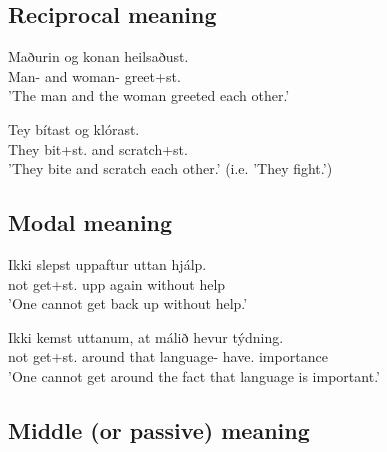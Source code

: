 \documentclass[12pt,%
]{lin-v2/lin}
\let\Oldsubsection\subsection
\renewcommand{\subsection}{\FloatBarrier\Oldsubsection}
\begin{document}
\subsection*{Reciprocal meaning}

\begin{exe}
    \ex
    \begin{xlist}
        \item \gll Maðurin og konan heilsaðust.\\
        Man-\Def{} and woman-\Def{} greet+st.\Pst\\
        \trans 'The man and the woman greeted each other.'\\
        \item \gll Tey bítast og klórast.\\
        They bit+st.\Prs{} and scratch+st.\Prs\\
        \trans 'They bite and scratch each other.' (i.e. 'They fight.')
    \end{xlist}
\end{exe}

\subsection*{Modal meaning}

\begin{exe}
    \ex
    \begin{xlist}
        \item \gll Ikki slepst uppaftur uttan hjálp.\\
        not get+st.\Prs{} {upp again} without help\\
        \trans 'One cannot get back up without help.'\\
        \item \gll Ikki kemst uttanum, at málið hevur týdning.\\
        not get+st.\Prs{} around that language-\Def{} have.\Prs{} importance\\
        \trans 'One cannot get around the fact that language is important.'\\
    \end{xlist}
\end{exe}

\subsection*{Middle (or passive) meaning}
\end{document}
